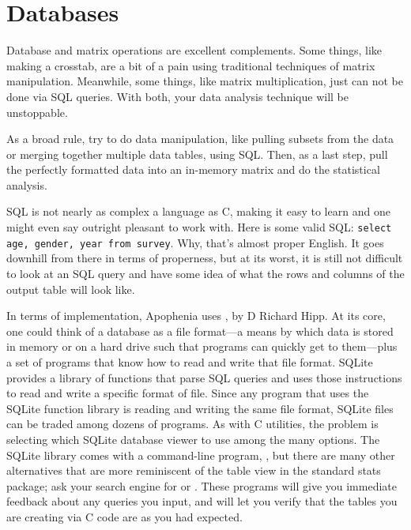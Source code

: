 \startonecol \chapter{Databases} \label{sql}\endonecol
\setsql %


Database and matrix operations are excellent
complements. Some things, like making a crosstab, are a bit of a
pain using traditional techniques of matrix manipulation. Meanwhile,
some things, like matrix multiplication, just can not be done via SQL
queries. With both, your data analysis technique will be unstoppable.

As a broad rule, try to do data manipulation, like pulling subsets
from the data or merging together multiple data tables, using SQL. Then,
as a last step, pull the perfectly formatted data into an in-memory matrix and
do the statistical analysis. 

SQL is not nearly as complex a language as C, making it easy to learn and
one might even say outright pleasant to work with. Here is some valid SQL:
{\tt select age, gender, year from survey}. Why, that's almost proper
English. It goes downhill from there in terms of properness, but at its
worst, it is still not difficult to look at an SQL query and have some
idea of what the rows and columns of the output table will look like.

In terms of implementation, Apophenia uses , by D Richard
Hipp. At its core, one could think of a database as a file format---a
means by which data is stored in memory or on a hard drive such that
programs can quickly get to them---plus a set of programs that know how
to read and write that file format. SQLite provides a library of functions
that parse SQL queries and uses those instructions to read and write
a specific format of file. Since any program that uses the SQLite
function library is reading and writing the same file format, SQLite
files can be traded among dozens of programs. As with C utilities,
the problem is selecting which SQLite database viewer to use among the
many options. The SQLite library comes with a command-line program,
, but there are many other alternatives that are more
reminiscent of the table view in the standard stats package; ask your
search engine for  or . These
programs will give you immediate feedback about any queries you input,
and will let you verify that the tables you are creating via C code are
as you had expected.

